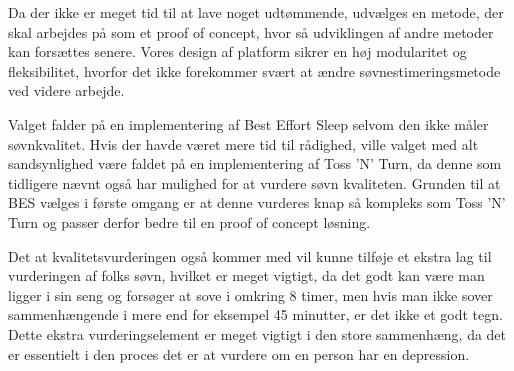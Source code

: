 Da der ikke er meget tid til at lave noget udtømmende, udvælges en metode, der skal arbejdes på som et proof of concept, hvor så udviklingen af andre metoder kan forsættes senere.
Vores design af platform sikrer en høj modularitet og fleksibilitet, hvorfor det ikke forekommer svært at ændre søvnestimeringsmetode ved videre arbejde.

Valget falder på en implementering af Best Effort Sleep selvom den ikke måler søvnkvalitet.
Hvis der havde været mere tid til rådighed, ville valget med alt sandsynlighed være faldet på en implementering af Toss 'N' Turn, da denne som tidligere nævnt også har mulighed for at vurdere søvn kvaliteten.
Grunden til at BES vælges i første omgang er at denne vurderes knap så kompleks som Toss 'N' Turn og passer derfor bedre til en proof of concept løsning.

Det at kvalitetsvurderingen også kommer med vil kunne tilføje et ekstra lag til vurderingen af folks søvn, hvilket er meget vigtigt, da det godt kan være man ligger i sin seng og forsøger at sove i omkring 8 timer, men hvis man ikke sover sammenhængende i mere end for eksempel 45 minutter, er det ikke et godt tegn.
Dette ekstra vurderingselement er meget vigtigt i den store sammenhæng, da det er essentielt i den proces det er at vurdere om en person har en depression. 